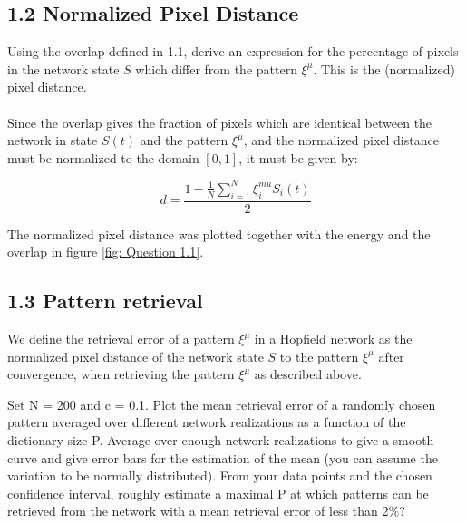 \subsection{1.2 Normalized Pixel Distance}
\small
\begin{itshape}
Using the overlap defined in 1.1, derive an expression for the percentage of pixels in the network state $S$ which differ from the pattern $\xi^\mu$. This is the (normalized) pixel distance.
\end{itshape}

\paragraph*{}
\normalsize
Since the overlap gives the fraction of pixels which are identical between the network in state $S(t)$ and the pattern $\xi^\mu$, and the normalized pixel distance must be normalized to the domain $[0,1]$, it must be given by:

\begin{equation}
d=\frac{1- \frac{1}{N} \sum_{i=1}^N \xi_i^{mu} S_i(t)}{2}
\end{equation}

The normalized pixel distance was plotted together with the energy and the overlap in figure \ref{fig: Question 1.1}.

\subsection{1.3 Pattern retrieval}
\small
\begin{itshape}
We define the retrieval error of a pattern $\xi^\mu$ in a Hopfield network as the normalized pixel distance of the network state $S$ to the pattern $\xi^\mu$ after convergence, when retrieving the pattern $\xi^\mu$ as described above.

Set N = 200 and c = 0.1. Plot the mean retrieval error of a randomly chosen pattern averaged over different network realizations as a function of the dictionary size P. Average over enough network realizations to give a smooth curve and give error bars for the estimation of the mean (you can assume the variation to be normally distributed). From your data points and the chosen confidence interval, roughly estimate a maximal P at which patterns can be retrieved from the network with a mean retrieval error of less than 2$\%$?

\end{itshape}

